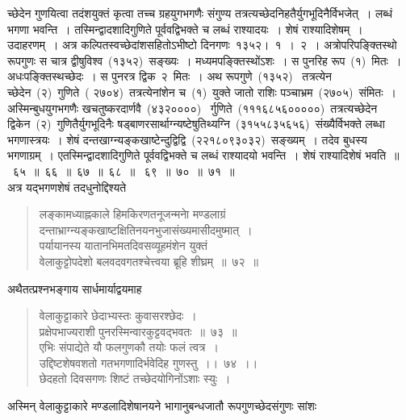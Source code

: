 \documentclass[11pt, openany]{book}
\begin{document}
\newpage
\thispagestyle{fancy}
\fancyhf{}

\noindent
च्छेदेन गुणयित्वा तदंशयुक्तं कृत्वा तच्च ग्रहयुगभगणैः संगुण्य तत्रत्यच्छेदनिहतैर्युगभूदिनैर्विभजेत्~। लब्धं भगणा भवन्ति~। तस्मिन्द्वादशादिगुणिते
पूर्ववद्विभक्ते च लब्धं राश्यादयः~। शेषं राश्यादिशेषम्~। उदाहरणम्~। अत्र
कल्पितस्वच्छेदांशसहितोऽभीष्टो दिनगणः~१३५२।~१~।~२~। अत्रोपरिपङ्क्तिस्थो रूपगुणः स चात्र द्वीषुविश्व~(१३५२)~सङ्ख्यः~। मध्यमपङ्क्तिस्थोंऽशः~। स पुनरिह रूप~(१)~मितः~।अधःपङ्क्तिस्थच्छेदः~। स पुनरत्र द्विक~२~मितः~। अथ रूपगुणे~(१३५२)~ तत्रत्येन च्छेदेन~(२)~गुणिते~( २७०४)~तत्रत्येनांशेन च~(१)~युक्ते जातो राशिः पञ्चाभ्रम~(२७०५)~संमितः~। अस्मिन्बुधयुगभगणैः खचतुष्करदार्णवै~(४३२००००)~ र्गुणिते~(१११६८५६०००००)~तत्रत्यच्छेदेन द्विकेन~(२)~गुणितैर्युगभूदिनैः षड्बाणरसार्थाग्न्यष्टेषुतिथ्यग्नि~(३१५५८३५६५६)~संख्यैर्विभक्ते लब्धा भगणास्त्रयः~। शेषं दन्तखाग्न्यङ्कखाष्टेन्दुद्विद्वि~(२२१८०९३०३२)~सङ्ख्यम्~। तदेव बुधस्य भगणाग्रम्~। एतस्मिन्द्वादशादिगुणिते पूर्ववद्विभक्ते च लब्धं राश्यादयो भवन्ति~। शेषं राश्यादिशेषं भवति~॥~६५~॥~६६~॥~६७~॥~६८~॥
~६९~॥~७०~॥~७१~॥\\

\indent
अत्र यद्भगणशेषं तदधुनोद्दिश्यते\textendash

\begin{quote}
{\ks लङ्कामध्याह्नकाले हिमकिरणतनूजन्मनाे मण्डलाग्रं\\
दन्ताभ्राग्न्यङ्कखाष्टक्षितिनयनभुजासंख्यमासीदमुष्मात्~।\\
पर्यायानस्य यातानभिमतदिवसव्यूहमंशेन युक्तं\\
वेलाकुट्टोपदेशो बलवदवगतश्चेत्त्वया ब्रूहि शीघ्रम्~॥~७२~॥}
\end{quote}

\indent
अथैतत्प्रश्नभङ्गाय सार्धमार्याद्वयमाह\textendash

\begin{quote}
{\ks वेलाकुट्टाकारे छेदाभ्यस्तः कुवासरश्छेदः~।\\
प्रक्षेपभाज्यराशी पुनरस्मिन्वारकुट्टवद्भवतः~॥~७३~॥\\
एभिः संपाद्येते यौ फलगुणकौ तयोः फलं त्वत्र~।\\
उद्दिष्टशेषवशतो गतभगणादिर्भवेदिह गुणस्तु~।।~७४~।।\\
छेदहतो दिवसगणः शिष्टं तच्छेदयोगिनोंऽशाः स्युः~।}
\end{quote}

\indent
अस्मिन् वेलाकुट्टाकारे मण्डलादिशेषानयने भागानुबन्धजातौ रूपगुणच्छेदसंगुणः सांशः\textendash

\newpage
\thispagestyle{fancy}
\fancyhf{}
\end{document}
